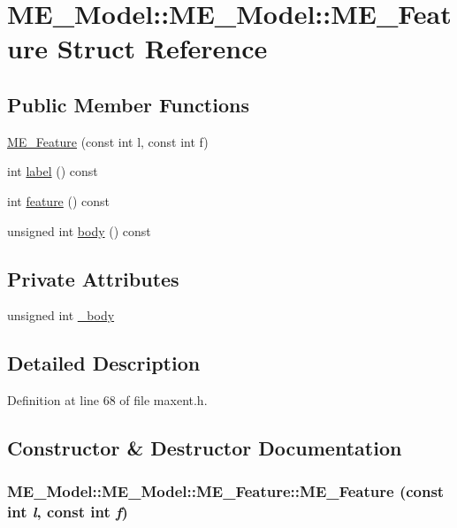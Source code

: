 \hypertarget{structME__Model_1_1ME__Feature}{
\section{ME\_\-Model::ME\_\-Model::ME\_\-Feature Struct Reference}
\label{structME__Model_1_1ME__Feature}
}
\subsection*{Public Member Functions}
\begin{CompactItemize}
\item 
\hyperlink{structME__Model_1_1ME__Feature_c6d4ddea49de2cf8c749fae3e3588e5e}{ME\_\-Feature} (const int l, const int f)
\item 
int \hyperlink{structME__Model_1_1ME__Feature_7357fa87b4d4760b2410d68bfb7e43c5}{label} () const 
\item 
int \hyperlink{structME__Model_1_1ME__Feature_96e93b09b9d9778e302f78a66010e584}{feature} () const 
\item 
unsigned int \hyperlink{structME__Model_1_1ME__Feature_99e28a449267c9ccaacaa903c4147ec0}{body} () const 
\end{CompactItemize}
\subsection*{Private Attributes}
\begin{CompactItemize}
\item 
unsigned int \hyperlink{structME__Model_1_1ME__Feature_23b671df1acedf1260ec775d4ac0a8c7}{\_\-body}
\end{CompactItemize}


\subsection{Detailed Description}


Definition at line 68 of file maxent.h.

\subsection{Constructor \& Destructor Documentation}
\hypertarget{structME__Model_1_1ME__Feature_c6d4ddea49de2cf8c749fae3e3588e5e}{
\subsubsection[{ME\_\-Feature}]{\setlength{\rightskip}{0pt plus 5cm}ME\_\-Model::ME\_\-Model::ME\_\-Feature::ME\_\-Feature (const int {\em l}, \/  const int {\em f})}}
\label{structME__Model_1_1ME__Feature_c6d4ddea49de2cf8c749fae3e3588e5e}




